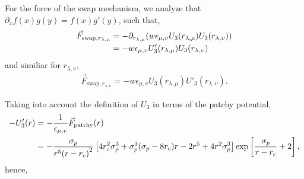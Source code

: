 \documentclass[main.tex]{subfiles}
\begin{document}
For the force of the swap mechanism, we analyze that $\partial_x f(x)g(y)=f(x)g'(y)$, such that,
\begin{align*}
    \vec{F}_{\mathrm{swap},r_{\lambda,\mu}} &= -\partial_{r_{\lambda,\mu}}\qty(w\epsilon_{\mu,\upsilon}U_3(r_{\lambda,\mu})U_3(r_{\lambda,\upsilon})) \\
                                            &= -w\epsilon_{\mu,\upsilon}U'_3(r_{\lambda,\mu})U_3(r_{\lambda,\upsilon})
\end{align*}
and similiar for $r_{\lambda,\upsilon}$,
\begin{gather*}
    \vec{F}_{\mathrm{swap},r_{\lambda,\upsilon}} = -w\epsilon_{\mu,\upsilon}U_3(r_{\lambda,\mu})U'_3(r_{\lambda,\upsilon}).
\end{gather*}

Taking into account the definition of $U_3$ in terms of the patchy potential,
\begin{align*}
    -U'_3(r) &= -\frac{1}{\epsilon_{\mu,\upsilon}}\vec{F}_{\mathrm{patchy}}(r) \\
             &= -\frac{\sigma_p}{r^5\qty(r-r_c)^2} \left[ 4r_c^2\sigma^3_p + \sigma^3_p\qty(\sigma_p-8r_c) r -2r^5 + 4r^2 \sigma^3_p \right] \exp\left[\frac{\sigma_p}{r-r_c}+2\right],
\end{align*}
hence,
\end{document}
